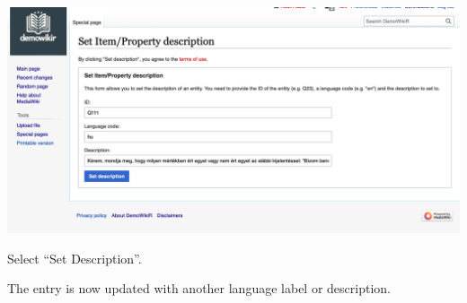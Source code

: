 \documentclass[
  letterpaper,
  DIV=11,
  numbers=noendperiod]{scrreprt}
\begin{document}
\begin{center}
\includegraphics{png/question_to_wikibase/Set_IetmProperty_Description_2x1.png}
\end{center}
Select ``Set Description''.

The entry is now updated with another language label or description.
\end{document}
